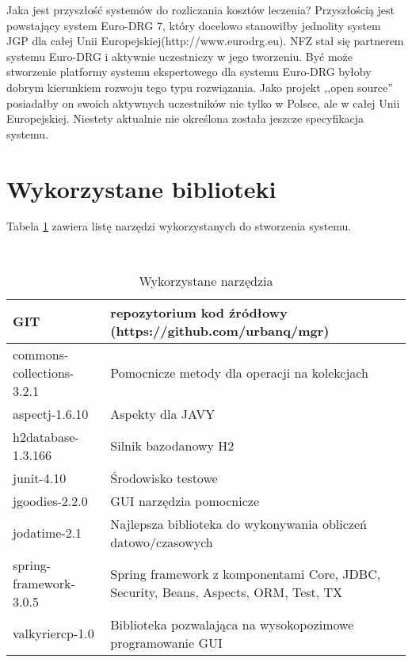 Jaka jest przyszłość systemów do rozliczania kosztów leczenia?
Przyszłością jest powstający system Euro-DRG 7, który docelowo stanowiłby jednolity system JGP dla całej Unii Europejskiej(http://www.eurodrg.eu).
NFZ stał się partnerem systemu Euro-DRG i aktywnie uczestniczy w jego tworzeniu. Być może stworzenie platformy systemu ekspertowego dla systemu Euro-DRG byłoby dobrym kierunkiem rozwoju tego typu rozwiązania. Jako projekt ,,open source'' posiadałby on swoich aktywnych uczestników nie tylko w Polsce, ale w całej Unii Europejskiej. Niestety aktualnie nie określona została jeszcze specyfikacja systemu. 
\begin{comment}
Problematyczne jest podejście wszystkich firm startujących w przetargach, ponieważ każda z nich chce mieć monopol na cały obszar zastosowania systemu. Jest to w mojej opinii poważna przeszkoda w tworzeniu najlepszej jakości oprogramowania, ponieważ w jej wyniku powstają systemy skomplikowane, ktorych używa się tylko dlatego, że nie ma innej alternatywy. Podobnie jak system operacyjny Linux jest ciągle ,,konkurencją'' dla systemu Winodws, tak samo oprogramowanie openSource w każdej dziedzinie będzie uczestniczyć w nieustającym wyścigu z oprogramowaniem komercyjnym. 
\end{comment}

\section{Wykorzystane biblioteki}
\label{sec:wykorzystaneBiblioteki}
Tabela \ref{tab:tools} zawiera listę narzędzi wykorzystanych do stworzenia systemu.
\begin{table}[h]
 \caption{Wykorzystane narzędzia}
 \small\tt
 \centering
 \vspace{0in}
 \begin{tabular}{|l|p{7cm}|}
 \hline
 GIT & repozytorium kod źródłowy (https://github.com/urbanq/mgr) \\
 \hline
 commons-collections-3.2.1 & Pomocnicze metody dla operacji na kolekcjach \\
 \hline
 aspectj-1.6.10 & Aspekty dla JAVY \\
 \hline
 h2database-1.3.166 & Silnik bazodanowy H2 \\
 \hline
 junit-4.10 & Środowisko testowe \\
 \hline
 jgoodies-2.2.0 & GUI narzędzia pomocnicze \\
 \hline
 jodatime-2.1 & Najlepsza biblioteka do wykonywania obliczeń datowo/czasowych \\
 \hline
 spring-framework-3.0.5 & Spring framework z komponentami Core, JDBC, Security, Beans, Aspects, ORM, Test, TX \\
 \hline
 valkyriercp-1.0 & Biblioteka pozwalająca na wysokopozimowe programowanie GUI \\
 \hline
 \end{tabular}
 \label{tab:tools}
\end{table}

